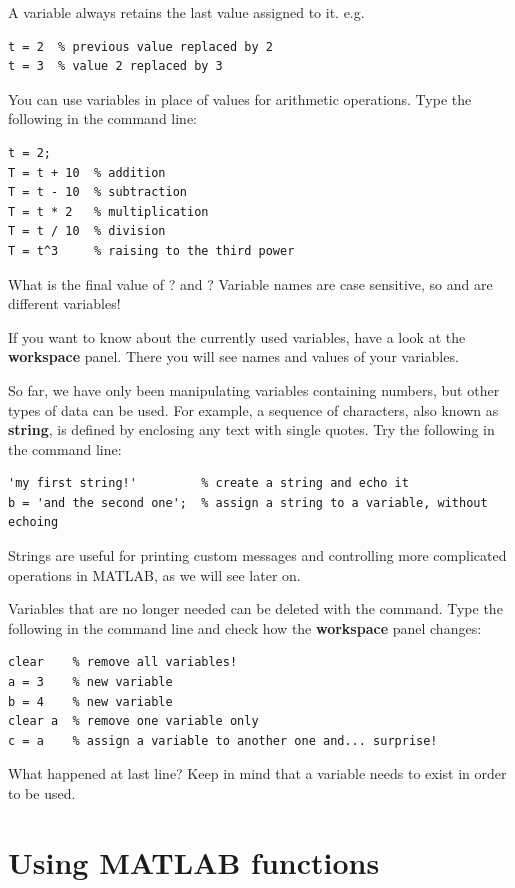\documentclass{article}
\begin{document}
A variable always retains the last value assigned to it. e.g.
\begin{lstlisting}
t = 2  % previous value replaced by 2
t = 3  % value 2 replaced by 3
\end{lstlisting}

You can use variables in place of values for arithmetic operations.
Type the following in the command line:
\begin{lstlisting}
t = 2;
T = t + 10  % addition
T = t - 10  % subtraction
T = t * 2   % multiplication
T = t / 10  % division
T = t^3     % raising to the third power
\end{lstlisting}

What is the final value of ? and ?
Variable names are case sensitive, so  and  are different variables!%

If you want to know about the currently used variables, have a look at the \textbf{workspace} panel.
There you will see names and values of your variables.

So far, we have only been manipulating variables containing numbers, but other types of data can be used.
For example, a sequence of characters, also known as \textbf{string}, is defined by enclosing any text with single quotes.
Try the following in the command line:
\begin{lstlisting}
'my first string!'         % create a string and echo it
b = 'and the second one';  % assign a string to a variable, without echoing
\end{lstlisting}
Strings are useful for printing custom messages and controlling more complicated
operations in MATLAB, as we will see later on. 

Variables that are no longer needed can be deleted with the  command.
Type the following in the command line and check how the \textbf{workspace} panel changes:
\begin{lstlisting}
clear    % remove all variables!
a = 3    % new variable
b = 4    % new variable
clear a  % remove one variable only
c = a    % assign a variable to another one and... surprise!
\end{lstlisting}
What happened at last line? Keep in mind that a variable needs to exist in order to be used.


\section{Using MATLAB functions}
\end{document}
